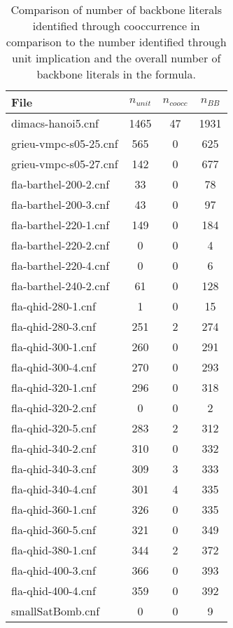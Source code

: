 \begin{wraptable}[31]{l}{8cm}
\begin{tabular}{l| c c c }
File& $n_{unit}$ & $n_{coocc}$ & $n_{BB}$\\
\hline
dimacs-hanoi5.cnf & 1465 & 47 & 1931 \\
grieu-vmpc-s05-25.cnf & 565 & 0 & 625 \\
grieu-vmpc-s05-27.cnf & 142 & 0 & 677 \\
fla-barthel-200-2.cnf & 33 & 0 & 78 \\
fla-barthel-200-3.cnf & 43 & 0 & 97 \\
fla-barthel-220-1.cnf & 149 & 0 & 184 \\
fla-barthel-220-2.cnf & 0 & 0 & 4 \\
fla-barthel-220-4.cnf & 0 & 0 & 6 \\
fla-barthel-240-2.cnf & 61 & 0 & 128 \\
fla-qhid-280-1.cnf & 1 & 0 & 15 \\
fla-qhid-280-3.cnf & 251 & 2 & 274 \\
fla-qhid-300-1.cnf & 260 & 0 & 291 \\
fla-qhid-300-4.cnf & 270 & 0 & 293 \\
fla-qhid-320-1.cnf & 296 & 0 & 318 \\
fla-qhid-320-2.cnf & 0 & 0 & 2 \\
fla-qhid-320-5.cnf & 283 & 2 & 312 \\
fla-qhid-340-2.cnf & 310 & 0 & 332 \\
fla-qhid-340-3.cnf & 309 & 3 & 333 \\
fla-qhid-340-4.cnf & 301 & 4 & 335 \\
fla-qhid-360-1.cnf & 326 & 0 & 335 \\
fla-qhid-360-5.cnf & 321 & 0 & 349 \\
fla-qhid-380-1.cnf & 344 & 2 & 372 \\
fla-qhid-400-3.cnf & 366 & 0 & 393 \\
fla-qhid-400-4.cnf & 359 & 0 & 392 \\
smallSatBomb.cnf & 0 & 0 & 9 \\
\end{tabular}
\caption[Comparison of quick backbone identification strategies]{Comparison of number of backbone literals identified through cooccurrence in comparison to the number identified through unit implication and the overall number of backbone literals in the formula.}
\label{tab:coocBB}
\end{wraptable}

